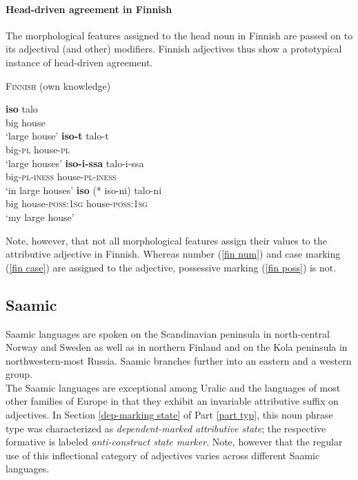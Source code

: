 \paragraph{Head-driven agreement in Finnish} \label{finnish synchr}
The morphological features assigned to the head noun in Finnish are passed on to its adjectival (and other) modifiers. Finnish adjectives thus show a prototypical instance of head-driven agreement. 
\begin{exe}
\ex \textsc{Finnish} (own knowledge)
\begin{xlist}
\ex
\gll	\textbf{iso} talo\\
	big house\\
\glt	‘large house’
\ex	\label{fin num}
\gll	\textbf{iso-t} talo-t\\
	big-\textsc{pl} house-\textsc{pl}\\
\glt	‘large houses’
\ex	\label{fin case}
\gll	\textbf{iso-i-ssa}	talo-i-ssa\\
	big-\textsc{pl}-\textsc{iness} house-\textsc{pl}-\textsc{iness}\\
\glt	‘in large houses’
\ex 	\label{fin poss}
\gll	\textbf{iso} (* iso-ni) talo-ni\\
	big {} house-\textsc{poss:1sg} house-\textsc{poss:1sg}\\
\glt	‘my large house’
\end{xlist}
\end{exe}
Note, however, that not all morphological features assign their values to the attributive adjective in Finnish. Whereas number (\ref{fin num}) and case marking (\ref{fin case}) are assigned to the adjective, possessive marking (\ref{fin poss}) is not.

\subsection{Saamic} \label{saami synchr}
Saamic languages are spoken on the Scandinavian peninsula in north-central Norway and Sweden as well as in northern Finland and on the Kola peninsula in northwestern-most Russia. Saamic branches further into an eastern and a western group.\\

\noindent The Saamic languages are exceptional among Uralic and the languages of most other families of Europe in that they exhibit an invariable attributive suffix on adjectives. In Section \ref{dep-marking state} of Part \ref{part typ}, this noun phrase type was characterized as \textit{dependent-marked attributive state}; the respective formative is labeled \textit{anti-construct state marker}. Note, however that the regular use of this inflectional category of adjectives varies across different Saamic languages.

